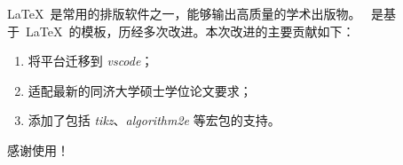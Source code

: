 \newcommand{\makespine}{
  \clearpage
  \thispagestyle{empty}
  \vspace*{\fill}
  \begin{center}
    \parbox[c][19.7cm][s]{1.2em}{
      \centering
      \fangsong\zihao{4}\bfseries         %
      \fontsize{14bp}{16bp}\selectfont    %
      \setlength{\parskip}{0pt}           %
      
      \tongji@posttitle                   %
      退化条件下的鲁棒语音转换算法研究
      \par\vfill
      \tongji@cauthor  
      宋昕宁                              %
      \par\vfill
      同济大学
    }
  \end{center}
  \vspace*{\fill}
  \clearpage
}
\makeatother


\begin{cabstract}
  \LaTeX~是常用的排版软件之一，能够输出高质量的学术出版物。
  \tongjithesis{}~是基于~\LaTeX~的模板，历经多次改进。本次改进的主要贡献如下：
  
  \begin{enumerate}[1.]
    \item 将平台迁移到 \emph{vscode}；
    \item 适配最新的同济大学硕士学位论文要求；
    \item 添加了包括 \emph{tikz}、\emph{algorithm2e} 等宏包的支持。
  \end{enumerate}

  感谢使用！
\end{cabstract}


\makeatletter
{}
\gdef\cheadingtitlenew#1{\gdef\tongji@cheadingtitlenew{#1}}
\cheadingtitlenew{\tongji@posttitle}
\patchcmd{\tongji@makeabstract}
  {\xparameter@heading@eother{\tongji@eabstractname}}
  {}
  {}{}
\makeatother


